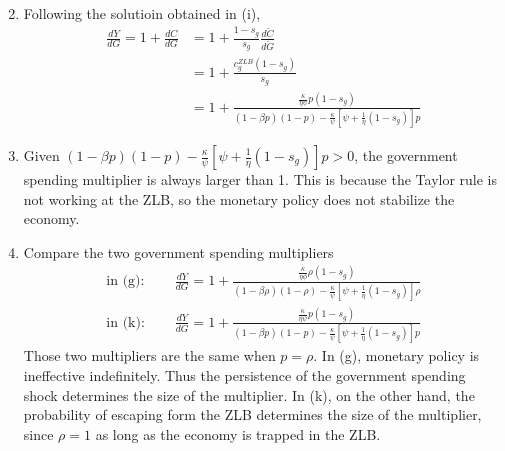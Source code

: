 \documentclass[11pt]{amsart}
\begin{document}
\begin{enumerate}[label = (\alph*)]
\begin{align*}
	\end{align*}
	\item Following the solutioin obtained in (i), 
	\begin{align*}
	\frac{d Y}{d G} =  1 + \frac{d C}{d G} &= 1 + \frac{1-s_g}{s_g} \frac{d \check{ C }}{d \check{ G }} \\
	& = 1 + \frac{c_g^{ZLB} (1-s_g)}{s_g} \\
	& = 1 + \frac { \frac { \kappa } { \eta \psi } p (1-s_g) } { ( 1- \beta p ) ( 1- p ) - \frac { \kappa } { \psi } \left[ \psi + \frac { 1} { \eta } \left( 1- s _ { g } \right) \right] p }
	\end{align*}
	\item Given $( 1- \beta p ) ( 1- p ) - \frac { \kappa } { \psi } \left[ \psi + \frac { 1} { \eta } \left( 1- s _ { g } \right) \right] p > 0$, the government spending multiplier is always larger than 1. This is because the Taylor rule is not working at the ZLB, so the monetary policy does not stabilize the economy. 
	\item Compare the two government spending multipliers
	\begin{align*}
	\text{in (g): }& \quad 	\frac{d Y}{d G} =  1 + \frac{\frac{\kappa}{\eta \phi} \rho(1-s_g)}{(1-\beta \rho)(1-\rho) - \frac{\kappa}{\psi} \left[ \psi + \frac{1}{\eta} (1-s_g) \right] \rho }\\
	\text{in (k): }& \quad \frac{d Y}{d G} = 1 + \frac { \frac { \kappa } { \eta \psi } p (1-s_g) } { ( 1- \beta p ) ( 1- p ) - \frac { \kappa } { \psi } \left[ \psi + \frac { 1} { \eta } \left( 1- s _ { g } \right) \right] p }
	\end{align*}
	Those two multipliers are the same when $p = \rho$. In (g), monetary policy is ineffective indefinitely. Thus the persistence of the government spending shock determines the size of the multiplier. In (k), on the other hand, the probability of escaping form the ZLB determines the size of the multiplier, since $\rho=1$ as long as the economy is trapped in the ZLB. 
\end{enumerate}
\end{document}
